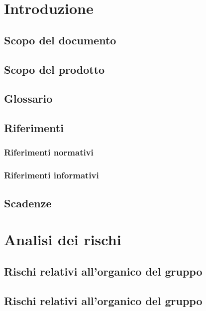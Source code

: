 \documentclass[a4paper, oneside, openany, dvipsnames, table]{article}
\begin{document}
\copertina{}


\newpage
\tableofcontents
\newpage

\section{Introduzione}
	\subsection{Scopo del documento}
		
	\subsection{Scopo del prodotto}
		
	\subsection{Glossario}
		
	\subsection{Riferimenti}
		\subsubsection{Riferimenti normativi}
			
		\subsubsection{Riferimenti informativi}
			
	\subsection{Scadenze}
		
\section{Analisi dei rischi}
	
	\subsection{Rischi relativi all'organico del gruppo}
		
	\subsection{Rischi relativi all'organico del gruppo}
\end{document}

